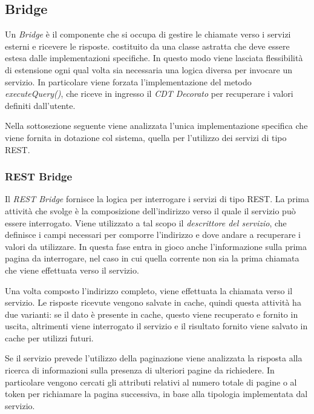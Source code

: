 \subsection{Bridge\label{sec:bridge}}

Un \emph{Bridge} è il componente che si occupa di gestire le chiamate verso i servizi esterni e ricevere le risposte. \upe costituito da una classe astratta che deve essere estesa dalle implementazioni specifiche. In questo modo viene lasciata flessibilità di estensione ogni qual volta sia necessaria una logica diversa per invocare un servizio. In particolare viene forzata l'implementazione del metodo \emph{executeQuery()}, che riceve in ingresso il \emph{CDT Decorato} per recuperare i valori definiti dall'utente.

Nella sottosezione seguente viene analizzata l'unica implementazione specifica che viene fornita in dotazione col sistema, quella per l'utilizzo dei servizi di tipo REST.

\subsubsection*{REST Bridge}

Il \emph{REST Bridge} fornisce la logica per interrogare i servizi di tipo REST. La prima attività che svolge è la composizione dell'indirizzo verso il quale il servizio può essere interrogato. Viene utilizzato a tal scopo il \emph{descrittore del servizio}, che definisce i campi necessari per comporre l'indirizzo e dove andare a recuperare i valori da utilizzare. In questa fase entra in gioco anche l'informazione sulla prima pagina da interrogare, nel caso in cui quella corrente non sia la prima chiamata che viene effettuata verso il servizio.

Una volta composto l'indirizzo completo, viene effettuata la chiamata verso il servizio. Le risposte ricevute vengono salvate in cache, quindi questa attività ha due varianti: se il dato è presente in cache, questo viene recuperato e fornito in uscita, altrimenti viene interrogato il servizio e il risultato fornito viene salvato in cache per utilizzi futuri.

Se il servizio prevede l'utilizzo della paginazione viene analizzata la risposta alla ricerca di informazioni sulla presenza di ulteriori pagine da richiedere. In particolare vengono cercati gli attributi relativi al numero totale di pagine o al token per richiamare la pagina successiva, in base alla tipologia implementata dal servizio.


